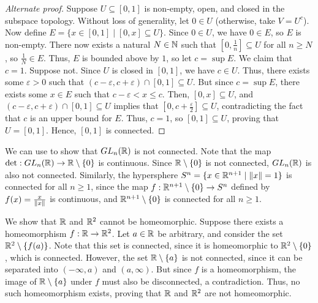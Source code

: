 \begin{proof}[Alternate proof]
    Suppose $U \subseteq [0,1]$ is non-empty, open, and closed in the subspace topology. Without loss of generality, let $0 \in U$ (otherwise, take $V = U^{c}$). Now define $E = \{x \in [0,1] \mid [0,x] \subseteq U\}$. Since $0 \in U$, we have $0 \in E$, so $E$ is non-empty. There now exists a natural $N \in \mathbb{N}$ such that $[0,\frac{1}{n}] \subseteq U$ for all $n \geq N$, so $\frac{1}{N} \in E$. Thus, $E$ is bounded above by $1$, so let $c = \sup E$. We claim that $c = 1$. Suppose not. Since $U$ is closed in $[0,1]$, we have $c \in U$. Thus, there exists some $\varepsilon > 0$ such that $(c-\varepsilon, c+\varepsilon) \cap [0,1] \subseteq U$. But since $c = \sup E$, there exists some $x \in E$ such that $c - \varepsilon < x \leq c$. Then, $[0,x] \subseteq U$, and $(c-\varepsilon, c+\varepsilon) \cap [0,1] \subseteq U$ implies that $[0, c + \frac{\varepsilon}{2}] \subseteq U$, contradicting the fact that $c$ is an upper bound for $E$. Thus, $c = 1$, so $[0,1] \subseteq U$, proving that $U = [0,1]$. Hence, $[0,1]$ is connected.
\end{proof}

\begin{example}
    We can use to show that $GL_{n}(\mathbb{R})$ is not connected. Note that the map $\det : GL_{n}(\mathbb{R}) \to \mathbb{R} \setminus \{0\}$ is continuous. Since $\mathbb{R} \setminus \{0\}$ is not connected, $GL_{n}(\mathbb{R})$ is also not connected. Similarly, the hypersphere $S^{n} = \{x \in \mathbb{R}^{n+1} \mid \left\lVert x\right\rVert = 1\}$ is connected for all $n \geq 1$, since the map $f : \mathbb{R}^{n+1} \setminus \{0\} \to S^{n}$ defined by $f(x) = \frac{x}{\left\lVert x\right\rVert}$ is continuous, and $\mathbb{R}^{n+1} \setminus \{0\}$ is connected for all $n \geq 1$.
\end{example}

\begin{example}
    We show that $\mathbb{R}$ and $\mathbb{R}^{2}$ cannot be homeomorphic. Suppose there exists a homeomorphism $f : \mathbb{R} \to \mathbb{R}^{2}$. Let $a \in \mathbb{R}$ be arbitrary, and consider the set $\mathbb{R}^{2} \setminus \{f(a)\}$. Note that this set is connected, since it is homeomorphic to $\mathbb{R}^{2} \setminus \{0\}$, which is connected. However, the set $\mathbb{R} \setminus \{a\}$ is not connected, since it can be separated into $(-\infty,a)$ and $(a,\infty)$. But since $f$ is a homeomorphism, the image of $\mathbb{R} \setminus \{a\}$ under $f$ must also be disconnected, a contradiction. Thus, no such homeomorphism exists, proving that $\mathbb{R}$ and $\mathbb{R}^{2}$ are not homeomorphic.
\end{example}


